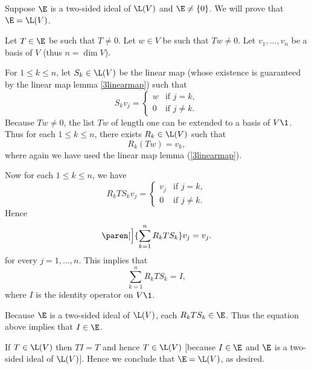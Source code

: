 \begin{Solution}
Suppose $\E$ is a two-sided ideal of $\L(V)$ and $\E \ne \{0\}$. We will prove that $\E = \L(V)$.

Let $T \in \E$ be such that $T \ne 0$. Let $w \in V$ be such that $Tw \ne 0$. Let $v_1, \dots, v_n$ be a basis of $V$ (thus $n = \dim V$).

For $1 \le k \le n$, let $S_k \in \L(V)$ be the linear map (whose existence is guaranteed by the linear map lemma \ref{3linearmap}) such that
\[
S_kv_j = \begin{cases}
w & \text{if } j = k,\\
0 & \text{if } j \ne k.
\end{cases}
\]
Because $Tw \ne 0$, the list $Tw$ of length one can be extended to a basis of $V\1$. Thus for each $1 \le k \le n$, there exists $R_k \in \L(V)$ such that
\[
R_k(Tw) = v_k,
\]
where again we have used the linear map lemma (\ref{3linearmap}).

Now for each $1 \le k \le n$, we have
\[
R_k T S_kv_j = \begin{cases}
v_j & \text{if } j = k,\\
0 & \text{if } j \ne k.
\end{cases}
\]
Hence
\[
\paren[\Big]{\sum_{k=1}^n R_kTS_k} v_j = v_j.
\]
for every $j = 1, \ldots, n$. This implies that
\[
\sum_{k=1}^n R_kTS_k = I,
\]
where $I$ is the identity operator on $V\1$.

Because $\E$ is a two-sided ideal of $\L(V)$, each $R_kTS_k \in \E$. Thus the equation above implies that $I \in \E$.

If $T \in \L(V)$ then $TI = T$ and hence $T \in \L(V)$ [because $I \in \E$ and $\E$ is a two-sided ideal of $\L(V)$]. Hence we conclude that $\E = \L(V)$, as desired.
\end{Solution}

